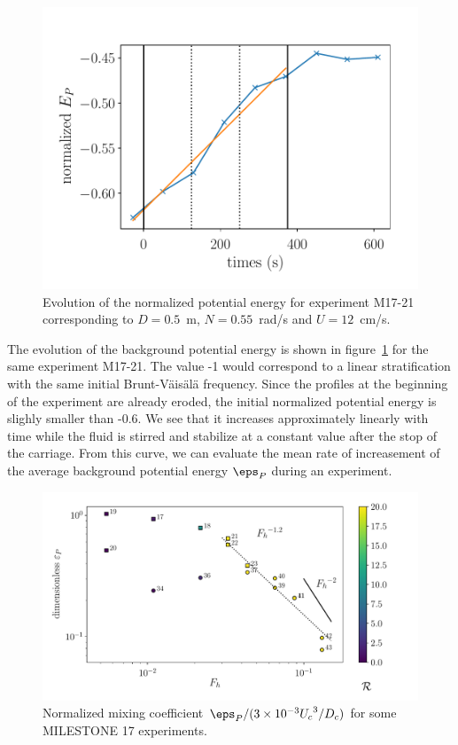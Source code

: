 \begin{figure}[htp!]
\centering
\includegraphics[width=0.7\figwidth]{tmp/fig_energy_pot_vs_time}

\caption{Evolution of the normalized potential energy for experiment M17-21
corresponding to $D = 0.5$~m, $N=0.55$~rad/s and $U=12$~cm/s.}%
\label{fig:energy:pot:vs:time}

\end{figure}

The evolution of the background potential energy is shown in
figure~\ref{fig:energy:pot:vs:time} for the same experiment M17-21. The value
-1 would correspond to a linear stratification with the same initial
Brunt-V\"ais\"al\"a frequency. Since the profiles at the beginning of the
experiment are already eroded, the initial normalized potential energy is
slighly smaller than -0.6. We see that it increases approximately linearly with
time while the fluid is stirred and stabilize at a constant value after the
stop of the carriage. From this curve, we can evaluate the mean rate of
increasement of the average background potential energy $\eps_P$ during an
experiment.


\begin{figure}[htp!]
\centering
\includegraphics[width=\figwidth]{tmp/fig_dt_pot_energy}

\caption{Normalized mixing coefficient $\eps_P / (3\times10^{-3} {U_c}^3/D_c)$
for some MILESTONE 17 experiments.}%
\label{fig:dt:pot:energy}

\end{figure}

